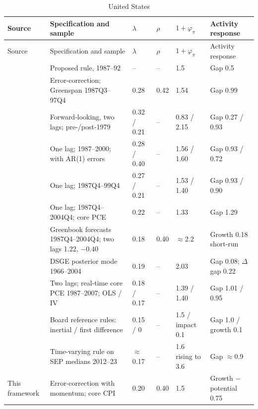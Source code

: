 \documentclass[11pt,a4paper]{article}
\begin{document}
\begin{footnotesize}
\setlength\tabcolsep{4pt}
\begin{longtable}{@{}L{28mm}L{44mm}L{12mm}L{8mm}L{18mm}L{28mm}@{}}
\caption{United States}\\
\toprule
Source & Specification and sample & $\lambda$ & $\rho$ & $1+\varphi_\pi$ & Activity response \\
\midrule
\endfirsthead
\toprule
Source & Specification and sample & $\lambda$ & $\rho$ & $1+\varphi_\pi$ & Activity response \\
\midrule
\endhead
\bottomrule
\endfoot
\textcite{taylor1993} & Proposed rule, 1987--92 & -- & -- & 1.5 & Gap 0.5 \\
\textcite{judd1998} & Error-correction; Greenspan 1987Q3--97Q4 & 0.28 & 0.42 & 1.54 & Gap 0.99 \\
\textcite{cgg2000} & Forward-looking, two lags; pre-/post-1979 & 0.32 / 0.21 & -- & 0.83 / 2.15 & Gap 0.27 / 0.93 \\
\textcite{english2003} & One lag; 1987--2000; with AR(1) errors & 0.28 / 0.40 & -- & 1.56 / 1.60 & Gap 0.93 / 0.72 \\
\textcite{rudebusch2002} & One lag; 1987Q4--99Q4 & 0.27 / 0.21 & -- & 1.53 / 1.40 & Gap 0.93 / 0.90 \\
\textcite{rudebusch2006} & One lag; 1987Q4--2004Q4; core PCE & 0.22 & -- & 1.33 & Gap 1.29 \\
\textcite{coibion2012} & Greenbook forecasts 1987Q4--2004Q4; two lags 1.22, $-0.40$ & 0.18 & 0.40 & $\approx$2.2 & Growth 0.18 short-run \\
\textcite{smetswouters2007} & DSGE posterior mode 1966--2004 & 0.19 & -- & 2.03 & Gap 0.08; $\Delta$gap 0.22 \\
\textcite{carvalho2021} & Two lags; real-time core PCE 1987--2007; OLS / IV & 0.18 / 0.17 & -- & 1.39 / 1.40 & Gap 1.01 / 0.95 \\
\textcite{fedrules2018} & Board reference rules: inertial / first difference & 0.15 / 0 & -- & 1.5 / impact 0.1 & Gap 1.0 / growth 0.1 \\
\textcite{gonzalez2023} & Time-varying rule on SEP medians 2012--23 & $\approx$0.17 & -- & 1.6 rising to 3.6 & Gap $\approx$0.9 \\
This framework & Error-correction with momentum; core CPI & 0.20 & 0.40 & 1.5 & Growth $-$ potential 0.75 \\
\end{longtable}


\end{footnotesize}
\end{document}
